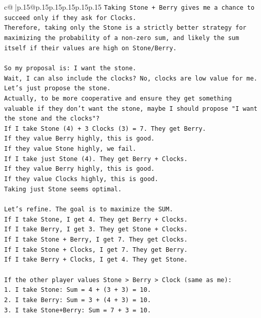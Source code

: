 \documentclass{article}
\begin{document}
{\begin{supertabular}{c@{$\;$}|p{.15\linewidth}@{}p{.15\linewidth}p{.15\linewidth}p{.15\linewidth}p{.15\linewidth}p{.15\linewidth}}
{{{\texttt{Taking Stone + Berry gives me a chance to succeed only if they ask for Clocks.} \\
\texttt{Therefore, taking only the Stone is a strictly better strategy for maximizing the probability of a non{-}zero sum, and likely the sum itself if their values are high on Stone/Berry.} \\
\\ 
\texttt{So my proposal is: I want the stone.} \\
\texttt{Wait, I can also include the clocks? No, clocks are low value for me.} \\
\texttt{Let's just propose the stone.} \\
\texttt{Actually, to be more cooperative and ensure they get something valuable if they don't want the stone, maybe I should propose "I want the stone and the clocks"?} \\
\texttt{If I take Stone (4) + 3 Clocks (3) = 7. They get Berry.} \\
\texttt{If they value Berry highly, this is good.} \\
\texttt{If they value Stone highly, we fail.} \\
\texttt{If I take just Stone (4). They get Berry + Clocks.} \\
\texttt{If they value Berry highly, this is good.} \\
\texttt{If they value Clocks highly, this is good.} \\
\texttt{Taking just Stone seems optimal.} \\
\\ 
\texttt{Let's refine. The goal is to maximize the SUM.} \\
\texttt{If I take Stone, I get 4. They get Berry + Clocks.} \\
\texttt{If I take Berry, I get 3. They get Stone + Clocks.} \\
\texttt{If I take Stone + Berry, I get 7. They get Clocks.} \\
\texttt{If I take Stone + Clocks, I get 7. They get Berry.} \\
\texttt{If I take Berry + Clocks, I get 4. They get Stone.} \\
\\ 
\texttt{If the other player values Stone > Berry > Clock (same as me):} \\
\texttt{1. I take Stone: Sum = 4 + (3 + 3) = 10.} \\
\texttt{2. I take Berry: Sum = 3 + (4 + 3) = 10.} \\
\texttt{3. I take Stone+Berry: Sum = 7 + 3 = 10.} \\
}}}
\end{supertabular}}
\end{document}
